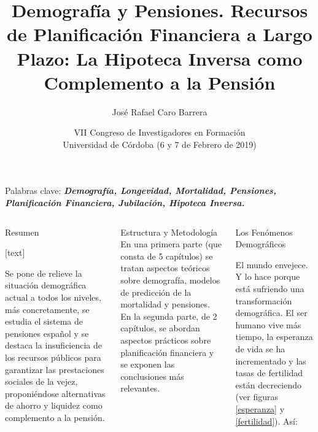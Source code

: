 \documentclass[]{beamer}
\date{VII Congreso de Investigadores en Formaci\'on\\ 
Universidad de C\'ordoba (6 y 7 de Febrero de 2019)}
\title{Demograf\'ia y Pensiones. Recursos de Planificaci\'on Financiera a Largo Plazo: La Hipoteca Inversa como Complemento a la Pensi\'on}
\author{Jos\'e Rafael Caro Barrera}
\institute{Dir.: Dr. D. Jos\'e M\textsuperscript{a} Caridad y Ocer\'in - Dpto. de Estad\'istica, Econometr\'ia e Investigaci\'on Operativa}
\begin{document}
\begin{frame}{\vspace{1ex}\hfill Palabras clave: \bfseries \textit{Demograf\'ia, Longevidad, Mortalidad, Pensiones, Planificaci\'on Financiera, Jubilaci\'on, Hipoteca Inversa.}}
	\begin{columns}[t]

\vspace{-1.5cm}
\begin{block}{Resumen}
			
			\small
			\begin{multicols}{2}
				[text]
				
				
				Se pone de relieve la situaci\'on demogr\'afica actual a todos los niveles, m\'as concretamente, se estudia el sistema de pensiones espa\~nol y se destaca la insuficiencia de los recursos p\'ublicos para garantizar las prestaciones sociales de la vejez, proponi\'endose alternativas de ahorro y liquidez como complemento a la pensi\'on.
			\end{multicols}
		\end{block}
		
		\vspace{-0.5cm}  %
		\begin{block}{Estructura y Metodolog\'ia}
			\setlength{\parindent}{1.2em}
			\setlength{\parskip}{0.5ex}
			En una primera parte (que consta de 5 cap\'itulos) se tratan aspectos te\'oricos sobre demograf\'ia, modelos de predicci\'on de la mortalidad y pensiones. En la segunda parte, de 2 cap\'itulos, se abordan aspectos pr\'acticos sobre planificaci\'on financiera y se exponen las conclusiones m\'as relevantes. 
		\end{block}
		
\vspace{-0.5cm}

		\begin{block}{Los Fen\'omenos Demogr\'aficos}
			\begin{multicols}{2}
				\setlength{\parindent}{1.2em}
				\setlength{\parskip}{1ex}

				El mundo envejece. Y lo hace porque est\'a sufriendo una transformaci\'on demogr\'afica. El ser humano vive m\'as tiempo, la esperanza de vida se ha incrementado y las tasas de fertilidad est\'an decreciendo (ver figuras \ref{esperanza} y \ref{fertilidad}). As\'i:


\end{multicols}
\end{block}
\end{columns}
\end{frame}
\end{document}
